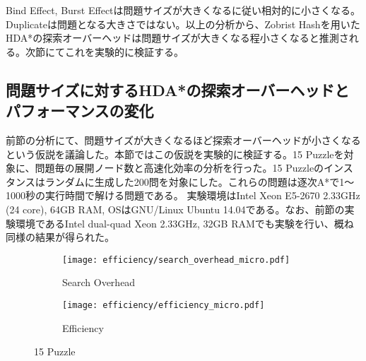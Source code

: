 \documentclass[uplatex]{jsarticle}
\begin{document}
Bind Effect, Burst Effectは問題サイズが大きくなるに従い相対的に小さくなる。Duplicateは問題となる大きさではない。以上の分析から、Zobrist Hashを用いたHDA*の探索オーバーヘッドは問題サイズが大きくなる程小さくなると推測される。次節にてこれを実験的に検証する。


\subsection{問題サイズに対するHDA*の探索オーバーヘッドとパフォーマンスの変化}
\label{sec:speedup_size}
前節の分析にて、問題サイズが大きくなるほど探索オーバーヘッドが小さくなるという仮説を議論した。本節ではこの仮説を実験的に検証する。15 Puzzleを対象に、問題毎の展開ノード数と高速化効率の分析を行った。15 Puzzleのインスタンスはランダムに生成した200問を対象にした。これらの問題は逐次A*で1～1000秒の実行時間で解ける問題である。%
実験環境はIntel Xeon E5-2670 2.33GHz (24 core), 64GB RAM, OSはGNU/Linux Ubuntu 14.04である。なお、前節の実験環境であるIntel dual-quad Xeon 2.33GHz, 32GB RAMでも実験を行い、概ね同様の結果が得られた。
\newline

\begin{figure}[h]
	\centering
	\begin{subfigure}{0.45\columnwidth}
		\texttt{[image: efficiency/search\_overhead\_micro.pdf]}	
		\caption{Search Overhead}
		\label{fig:david_so}
	\end{subfigure}
	\begin{subfigure}{0.45\columnwidth}
		\texttt{[image: efficiency/efficiency\_micro.pdf]}	
		\caption{Efficiency}
		\label{fig:david_speedup}
	\end{subfigure}
	\caption{15 Puzzle}
	\label{fig:15_david}
\end{figure}

\begin{comment}
\begin{figure}[h]
	\centering
	\begin{subfigure}{0.45\columnwidth}
		\texttt{[image: efficiency/search\_overhead\_24puzzle\_micro.pdf]}	
		\caption{Search Overhead}
		\label{fig:david_so_24}
	\end{subfigure}
	\begin{subfigure}{0.45\columnwidth}
		\texttt{[image: efficiency/efficiency\_24puzzle\_micro.pdf]}	
		\caption{Efficiency}
		\label{fig:david_speedup_24}
	\end{subfigure}
	\caption{24 Puzzle}
	\label{fig:24_david}
\end{figure}
\end{comment}
\end{document}
